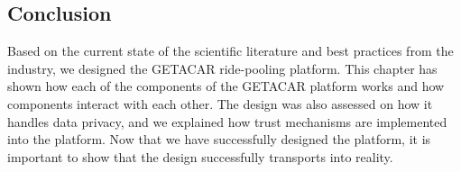 \subsection{Conclusion}
Based on the current state of the scientific literature and best practices from the industry, we designed the GETACAR ride-pooling platform. This chapter has shown how each of the components of the GETACAR platform works and how components interact with each other. The design was also assessed on how it handles data privacy, and we explained how trust mechanisms are implemented into the platform. Now that we have successfully designed the platform, it is important to show that the design successfully transports into reality. 
